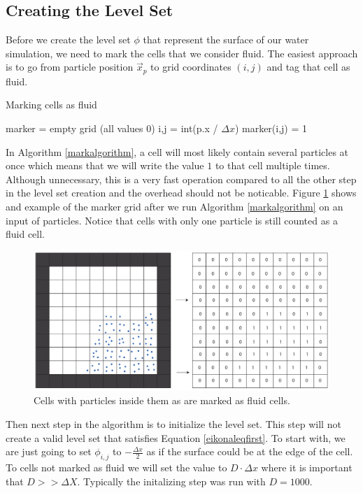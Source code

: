 \subsection{Creating the Level Set}

Before we create the level set $\phi$ that represent the surface of our water simulation, we need to mark the cells that we consider fluid. The easiest approach is to go from particle position $\vec{x}_p$ to grid coordinates $(i,j)$ and tag that cell as fluid.

\begin{algorithm}
\caption{Marking cells as fluid}
\begin{algorithmic}
\STATE marker = empty grid (all values 0)
\STATE i,j = int(p.x / $\Delta x$)
\STATE marker(i,j) = 1
\ENDFOR
\end{algorithmic}
\label{markalgorithm}
\end{algorithm}

In Algorithm \ref{markalgorithm}, a cell will most likely contain several particles at once which means that we will write the value $1$ to that cell multiple times. Although unnecessary, this is a very fast operation compared to all the other step in the level set creation and the overhead should not be noticable. Figure \ref{markerexample} shows and example of the marker grid after we run Algorithm \ref{markalgorithm} on an input of particles. Notice that cells with only one particle is still counted as a fluid cell.

\begin{figure}[ht!]
\centering
\includegraphics[width=130mm]{img/mark.pdf}
\caption{Cells with particles inside them as are marked as fluid cells.}
\label{markerexample}
\end{figure}

Then next step in the algorithm is to initialize the level set. This step will not create a valid level set that satisfies Equation \ref{eikonaleqfirst}. To start with, we are just going to set $\phi_{i,j}$ to $-\frac{\Delta x}{2}$ as if the surface could be at the edge of the cell. To cells not marked as fluid we will set the value to $D \cdot \Delta x$ where it is important that $D >> \Delta X$. Typically the initalizing step was run with $D = 1000$.


